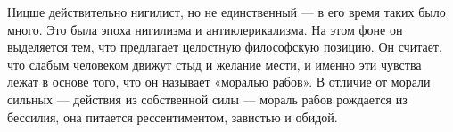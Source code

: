 
Ницше действительно нигилист, но не единственный --- в его время таких было много. Это была эпоха нигилизма и антиклерикализма. На этом фоне он выделяется тем, что предлагает целостную философскую позицию. Он считает, что слабым человеком движут стыд и желание мести, и именно эти чувства лежат в основе того, что он называет «моралью рабов». В отличие от морали сильных --- действия из собственной силы --- мораль рабов рождается из бессилия, она питается рессентиментом, завистью и обидой.

